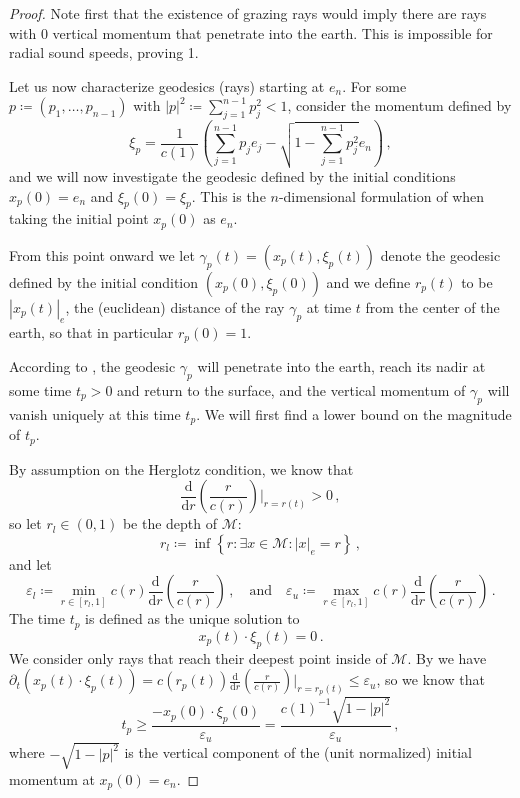\documentclass[
	fontsize=11pt, 
	twoside=false, 
	abstract=true, 
	a4paper,
]{scrartcl}
\newcommand{\eps}{\varepsilon}
\newcommand{\dd}{\mathrm{d}}
\newcommand{\abs}[1]{\left\lvert#1\right\rvert}
\newcommand{\del}{\partial}
\newcommand{\an}{\quad\text{and}\quad}
\begin{document}
\begin{proof}
	Note first that the existence of grazing rays would imply there are rays with $0$ vertical momentum that penetrate into the earth. This is impossible for radial sound speeds, proving 1.

	Let us now characterize geodesics (rays) starting at $e_n$. For some $p\coloneqq (p_1,\dots,p_{n-1})$ with $\abs{p}^2\coloneqq \sum_{j=1}^{n-1}p_j^2 < 1$, consider the momentum defined by
	\[
		\xi_p = \frac{1}{c(1)}\left(\sum_{j=1}^{n-1}p_je_j - \sqrt{1-\sum_{j=1}^{n-1}p_j^2}e_n\right)\,,
	\]
	and we will now investigate the geodesic defined by the initial conditions $x_p(0)=e_n$ and $\xi_p(0)= \xi_p$. This is the $n$-dimensional formulation of \cite[Eq.~(2.4)]{zbMATH07625517} when taking the initial point $x_p(0)$ as $e_n$. 

	From this point onward we let $\gamma_p(t) = (x_p(t),\xi_p(t))$ denote the geodesic defined by the initial condition $(x_p(0),\xi_p(0))$ and we define $r_p(t)$ to be $\abs{x_p(t)}_e$, the (euclidean) distance of the ray $\gamma_p$ at time $t$ from the center of the earth, so that in particular $r_p(0)=1$.

	According to \cite[Thm.~2.1.6]{zbMATH07625517}, the geodesic $\gamma_p$ will %
	penetrate into the earth, reach its nadir at some time $t_p>0$ and return to the surface, and the vertical momentum of $\gamma_p$ will vanish uniquely at this time $t_p$. We will first find a lower bound on the magnitude of $t_p$. 

	By assumption on the Herglotz condition, we know that 
	\[
		\frac{\dd}{\dd r}\left(\frac{r}{c(r)}\right)\bigg\vert_{r=r(t)} > 0\,,
	\]
	so let $r_l \in (0,1)$ be the depth of $\mathcal{M}$:
	\[
		r_l \coloneqq \inf\left\{r \colon \exists x\in\mathcal{M}\colon \abs{x}_e=r\right\}\,,
	\]
	and let 
	\[
		\eps_l \coloneqq \min_{r\in [r_l,1]} c(r)\frac{\dd}{\dd r}\left(\frac{r}{c(r)}\right)\,,\an 	\eps_u \coloneqq \max_{r\in [r_l,1]} c(r)\frac{\dd}{\dd r}\left(\frac{r}{c(r)}\right)\,.
	\]
	The time $t_p$ is defined as the unique solution to 
	\[
		x_p(t) \cdot \xi_p(t) = 0\,.
	\]
	We consider only rays that reach their deepest point inside of $\mathcal{M}$. By \cite[Eq.~(2.9)]{zbMATH07625517} we have $\del_t (x_p(t)\cdot \xi_p(t)) = c(r_p(t))\frac{\dd}{\dd r}\left(\frac{r}{c(r)}\right)\vert_{r=r_p(t)} \leq \eps_u$, so we know that
	\[
		t_p \geq \frac{-x_p(0)\cdot\xi_p(0)}{\eps_u} = \frac{c(1)^{-1}\sqrt{1-\abs{p}^2}}{\eps_u}\,,
	\]
	where $-\sqrt{1-\abs{p}^2}$ is the vertical component of the (unit normalized) initial momentum at $x_p(0)=e_n$. 


\end{proof}
\end{document}
